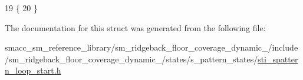 \begin{DoxyCode}
19   \{
20   \}
\end{DoxyCode}


The documentation for this struct was generated from the following file\+:\begin{DoxyCompactItemize}
\item 
smacc\+\_\+sm\+\_\+reference\+\_\+library/sm\+\_\+ridgeback\+\_\+floor\+\_\+coverage\+\_\+dynamic\+\_/include/sm\+\_\+ridgeback\+\_\+floor\+\_\+coverage\+\_\+dynamic\+\_/states/s\+\_\+pattern\+\_\+states/\hyperlink{sm__ridgeback__floor__coverage__dynamic__1_2include_2sm__ridgeback__floor__coverage__dynamic__1_515e41b58510b1443007a353659a1698}{sti\+\_\+spattern\+\_\+loop\+\_\+start.\+h}\end{DoxyCompactItemize}
